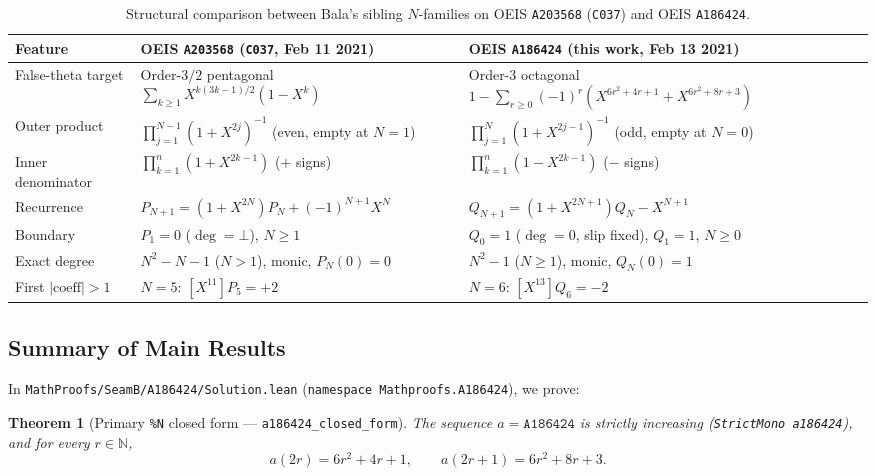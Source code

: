 \documentclass[11pt]{article}
\newtheorem{theorem}{Theorem}[section]
\theoremstyle{definition}
\newcommand{\N}{\mathbb{N}}
\newcommand{\seq}[1]{\texttt{#1}}
\begin{document}
\begin{table}[ht]
\centering
\caption{Structural comparison between Bala's sibling $N$-families on OEIS \seq{A203568} (\texttt{C037}) and OEIS \seq{A186424}.}
\label{tab:comparison}
\smallskip
{\small
\begin{tabular}{@{}l >{\raggedright\arraybackslash}p{5.5cm} >{\raggedright\arraybackslash}p{5.8cm}@{}}
\toprule
Feature & OEIS \seq{A203568} (\texttt{C037}, Feb 11 2021) & OEIS \seq{A186424} (this work, Feb 13 2021) \\
\midrule
False-theta target & Order-$3/2$ pentagonal $\sum_{k \ge 1} X^{k(3k-1)/2}(1 - X^k)$ & Order-$3$ octagonal $1 - \sum_{r \ge 0} (-1)^r (X^{6r^2+4r+1} + X^{6r^2+8r+3})$ \\
Outer product & $\prod_{j=1}^{N-1} (1 + X^{2j})^{-1}$ (even, empty at $N=1$) & $\prod_{j=1}^{N} (1 + X^{2j-1})^{-1}$ (odd, empty at $N=0$) \\
Inner denominator & $\prod_{k=1}^{n} (1 + X^{2k-1})$ ($+$ signs) & $\prod_{k=1}^{n} (1 - X^{2k-1})$ ($-$ signs) \\
Recurrence & $P_{N+1} = (1 + X^{2N}) P_N + (-1)^{N+1} X^N$ & $Q_{N+1} = (1 + X^{2N+1}) Q_N - X^{N+1}$ \\
Boundary & $P_1 = 0$ ($\deg = \bot$), $N \ge 1$ & $Q_0 = 1$ ($\deg = 0$, slip fixed), $Q_1 = 1$, $N \ge 0$ \\
Exact degree & $N^2 - N - 1$ ($N > 1$), monic, $P_N(0) = 0$ & $N^2 - 1$ ($N \ge 1$), monic, $Q_N(0) = 1$ \\
First $|\text{coeff}| > 1$ & $N = 5$: $[X^{11}] P_5 = +2$ & $N = 6$: $[X^{13}] Q_6 = -2$ \\
\bottomrule
\end{tabular}
}
\end{table}

\subsection{Summary of Main Results}

In \nolinkurl{MathProofs/SeamB/A186424/Solution.lean} (\nolinkurl{namespace Mathproofs.A186424}), we prove:

\begin{theorem}[Primary \texttt{\%N} closed form --- \texttt{a186424\_closed\_form}]
\label{thm:closed-form}
The sequence $a = \seq{A186424}$ is strictly increasing (\texttt{StrictMono a186424}), and for every $r \in \N$,
\[
a(2r) = 6r^2 + 4r + 1, \qquad a(2r + 1) = 6r^2 + 8r + 3.
\]
\end{theorem}
\end{document}
